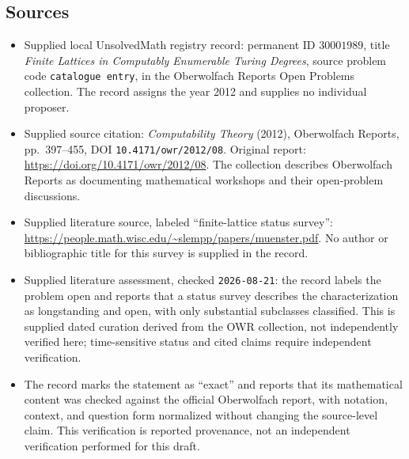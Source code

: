 \documentclass[11pt]{article}
\begin{document}
\subsection{Sources}
\begin{itemize}
\item Supplied local UnsolvedMath registry record: permanent ID \(30001989\), title \emph{Finite Lattices in Computably Enumerable Turing Degrees}, source problem code \texttt{catalogue entry}, in the Oberwolfach Reports Open Problems collection. The record assigns the year 2012 and supplies no individual proposer.
\item Supplied source citation: \emph{Computability Theory} (2012), Oberwolfach Reports, pp.\ 397--455, DOI \texttt{10.4171/owr/2012/08}. Original report: \url{https://doi.org/10.4171/owr/2012/08}. The collection describes Oberwolfach Reports as documenting mathematical workshops and their open-problem discussions.
\item Supplied literature source, labeled ``finite-lattice status survey'': \url{https://people.math.wisc.edu/~slempp/papers/muenster.pdf}. No author or bibliographic title for this survey is supplied in the record.
\item Supplied literature assessment, checked \texttt{2026-08-21}: the record labels the problem open and reports that a status survey describes the characterization as longstanding and open, with only substantial subclasses classified. This is supplied dated curation derived from the OWR collection, not independently verified here; time-sensitive status and cited claims require independent verification.
\item The record marks the statement as ``exact'' and reports that its mathematical content was checked against the official Oberwolfach report, with notation, context, and question form normalized without changing the source-level claim. This verification is reported provenance, not an independent verification performed for this draft.
\end{itemize}
\end{document}
